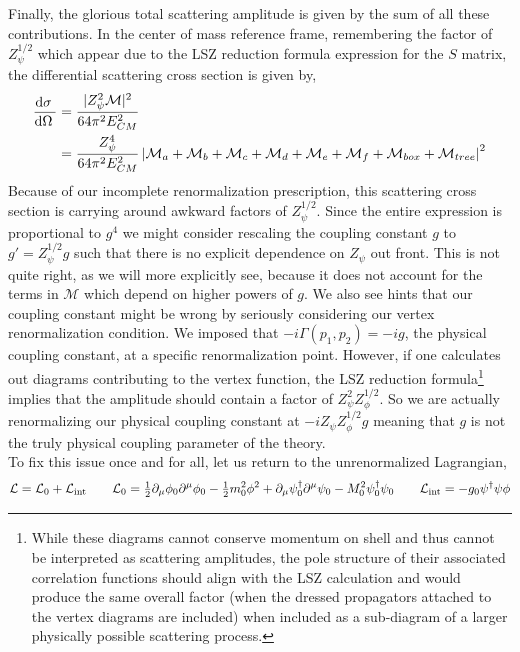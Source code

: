 \documentclass[12pt]{extarticle}
\begin{document}
Finally, the glorious total scattering amplitude is given by the sum of all these contributions. In the center of mass reference frame, remembering the factor of $Z_\psi^{1/2}$ which appear due to the LSZ reduction formula expression for the $S$ matrix, the differential scattering cross section is given by,
\begin{align*}
\frac{\mathrm{d}\sigma \:}{\mathrm{d}\Omega \:} & = \frac{|Z^2_{\psi} \mathcal{M}|^2}{64 \pi^2 E_{CM}^2}
\\
& = \frac{Z^4_{\psi}}{64 \pi^2 E_{CM}^2} \left| \mathcal{M}_a + \mathcal{M}_b + \mathcal{M}_c + \mathcal{M}_d + \mathcal{M}_e + \mathcal{M}_f + \mathcal{M}_{box} + \mathcal{M}_{tree} \right|^2 
\end{align*}
Because of our incomplete renormalization prescription, this scattering cross section is carrying around awkward factors of $Z_\psi^{1/2}$. Since the entire expression is proportional to $g^4$ we might consider rescaling the coupling constant $g$ to $g' = Z_\psi^{1/2} g$ such that there is no explicit dependence on $Z_\psi$ out front. This is not quite right, as we will more explicitly see, because it does not account for the terms in $\mathcal{M}$ which depend on higher powers of $g$. We also see hints that our coupling constant might be wrong by seriously considering our vertex renormalization condition. We imposed that $-i \Gamma(p_1, p_2) = -ig$, the physical coupling constant, at a specific renormalization point. However, if one calculates out diagrams contributing to the vertex function, the LSZ reduction formula\footnote{While these diagrams cannot conserve momentum on shell and thus cannot be interpreted as scattering amplitudes, the pole structure of their associated correlation functions should align with the LSZ calculation and would produce the same overall factor (when the dressed propagators attached to the vertex diagrams are included) when included as a sub-diagram of a larger physically possible scattering process.} implies that the amplitude should contain a factor of $Z_\psi^2 Z_\phi^{1/2}$. So we are actually renormalizing our physical coupling constant at $- i Z_\psi Z_\phi^{1/2} g$ meaning that $g$ is not the truly physical coupling parameter of the theory. \bigskip\\
To fix this issue once and for all, let us return to the unrenormalized Lagrangian,
\[ \mathcal{L} = \mathcal{L}_0 + \mathcal{L}_{\mathrm{int}} \quad \quad \mathcal{L}_0 = \tfrac{1}{2} \partial_\mu \phi_0 \partial^\mu \phi_0 - \tfrac{1}{2} m_0^2 \phi^2 + \partial_\mu \psi^\dagger_0 \partial^\mu \psi_0 - M_0^2 \psi^\dagger_0 \psi_0 \quad \quad \mathcal{L}_{\mathrm{int}} = -g_0 \psi^\dagger \psi \phi \]  
\end{document}
